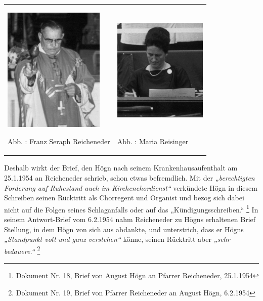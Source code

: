 \documentclass[a4paper]{article}
\newcommand\textstyleZitate[1]{\textit{#1}}
\newcounter{Abb}
\renewcommand\theAbb{\arabic{Abb}}
\begin{document}
\begin{center}
\begin{minipage}{10.084cm}
\begin{flushleft}
\tablefirsthead{}
\tablehead{}
\tabletail{}
\tablelasttail{}
\begin{supertabular}{m{5.018cm}m{4.6670003cm}}

\includegraphics[width=4.835cm,height=5.992cm]{pictures/zulassungsarbeit-img051.jpg}

Abb. \stepcounter{Abb}{\theAbb}: Franz Seraph Reicheneder &

\includegraphics[width=4.484cm,height=6.003cm]{pictures/zulassungsarbeit-img052.jpg}

Abb. \stepcounter{Abb}{\theAbb}: Maria Reisinger\\
\end{supertabular}
\end{flushleft}
\end{minipage}
\end{center}
Deshalb wirkt der Brief, den Högn nach seinem Krankenhausaufenthalt am
25.1.1954 an Reicheneder schrieb, schon etwas befremdlich. Mit der
\textstyleZitate{„berechtigten Forderung auf Ruhestand auch im
Kirchenchordienst“} verkündete Högn in diesem Schreiben seinen
Rücktritt als Chorregent und Organist und bezog sich dabei nicht auf
die Folgen seines Schlaganfalls oder auf das „Kündigungsschreiben.“
 \footnote{Dokument Nr. 18, Brief von August Högn an Pfarrer
Reicheneder, 25.1.1954} In seinem Antwort-Brief vom 6.2.1954 nahm
Reicheneder zu Högns erhaltenen Brief Stellung, in dem Högn von sich
aus abdankte, und unterstrich, dass er Högns
\textstyleZitate{„Standpunkt voll und ganz verstehen“} könne, seinen
Rücktritt aber \textstyleZitate{„sehr bedauere.“ } \footnote{Dokument
Nr. 19, Brief von Pfarrer Reicheneder an August Högn, 6.2.1954}
\end{document}
